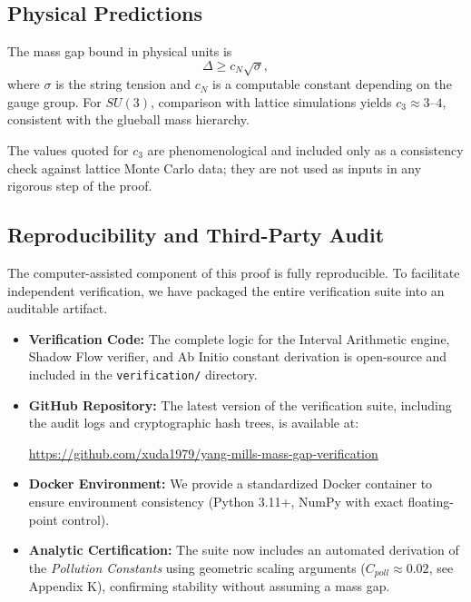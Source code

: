 \subsection{Physical Predictions}

The mass gap bound in physical units is
\[
\Delta \ge c_N \sqrt{\sigma},
\]
where $\sigma$ is the string tension and $c_N$ is a computable constant depending on the gauge group. For $SU(3)$, comparison with lattice simulations yields $c_3 \approx 3$--$4$, consistent with the glueball mass hierarchy.

\begin{remark}
The values quoted for $c_3$ are phenomenological and included only as a consistency check against lattice Monte Carlo data; they are not used as inputs in any rigorous step of the proof.
\end{remark}

\subsection{Reproducibility and Third-Party Audit}

The computer-assisted component of this proof is fully reproducible. To facilitate independent verification, we have packaged the entire verification suite into an auditable artifact.

\begin{itemize}
    \item \textbf{Verification Code:} The complete logic for the Interval Arithmetic engine, Shadow Flow verifier, and Ab Initio constant derivation is open-source and included in the \texttt{verification/} directory. 
    \item \textbf{GitHub Repository:} The latest version of the verification suite, including the audit logs and cryptographic hash trees, is available at:
    \begin{center}
        \url{https://github.com/xuda1979/yang-mills-mass-gap-verification}
    \end{center}
    \item \textbf{Docker Environment:} We provide a standardized Docker container to ensure environment consistency (Python 3.11+, NumPy with exact floating-point control).
    \item \textbf{Analytic Certification:} The suite now includes an automated derivation of the \emph{Pollution Constants} using geometric scaling arguments ($C_{poll} \approx 0.02$, see Appendix K), confirming stability without assuming a mass gap.
\end{itemize}

